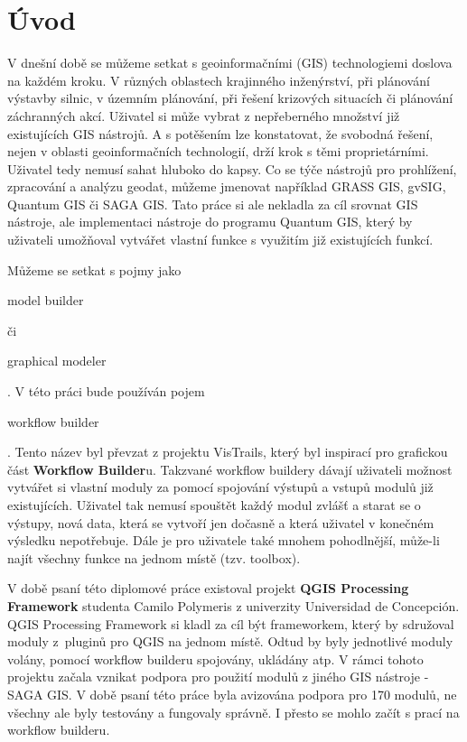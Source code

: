 \chapter*{Úvod}

V dnešní době se můžeme setkat s  geoinformačními (GIS)
technologiemi doslova na každém kroku. V různých oblastech krajinného
inženýrství, při plánování výstavby silnic, v územním plánování, při
řešení krizových situacích či plánování záchranných akcí. Uživatel si
může vybrat z nepřeberného množství již existujících GIS nástrojů. A s
potěšením lze konstatovat, že svobodná řešení, nejen v oblasti
geoinformačních technologií, drží krok s těmi proprietárními. Uživatel
tedy nemusí sahat hluboko do kapsy. Co se týče nástrojů pro
prohlížení, zpracování a analýzu  geodat, můžeme
jmenovat například GRASS GIS, gvSIG, Quantum GIS či SAGA GIS. Tato
práce si ale nekladla za cíl srovnat GIS nástroje, ale implementaci
nástroje do programu Quantum GIS, který by uživateli umožňoval
vytvářet vlastní funkce s využitím již existujících funkcí.

Můžeme se setkat s pojmy jako \begin{scriptsize}model
  builder\end{scriptsize} či \begin{scriptsize}graphical
    modeler\end{scriptsize}. V této práci bude používán
    pojem \begin{scriptsize}workflow builder\end{scriptsize}. Tento
      název byl převzat z projektu  VisTrails, který
      byl inspirací pro grafickou část \textbf{Workflow
        Builder}u. Takzvané workflow buildery dávají uživateli možnost
      vytvářet si vlastní moduly za pomocí spojování výstupů a vstupů
      modulů již existujících. Uživatel tak nemusí spouštět každý
      modul zvlášť a starat se o výstupy, nová data, která se vytvoří
      jen dočasně a která uživatel v konečném výsledku
      nepotřebuje. Dále je pro uživatele také mnohem pohodlnější,
      může-li najít všechny funkce na jednom místě (tzv. toolbox).


V době psaní této diplomové práce existoval projekt  \textbf{QGIS Processing Framework} studenta
Camilo Polymeris z univerzity Universidad de Concepción. QGIS
Processing Framework si kladl za cíl být frameworkem, který by
sdružoval moduly z~pluginů pro QGIS na jednom místě. Odtud by byly
jednotlivé moduly volány, pomocí workflow builderu spojovány, ukládány
atp. V rámci tohoto projektu začala vznikat podpora pro použití modulů
z jiného GIS nástroje -  SAGA GIS. V době psaní této
práce byla avizována podpora pro 170 modulů, ne všechny ale byly testovány
a fungovaly správně. I přesto se mohlo začít s prací na workflow
builderu.

